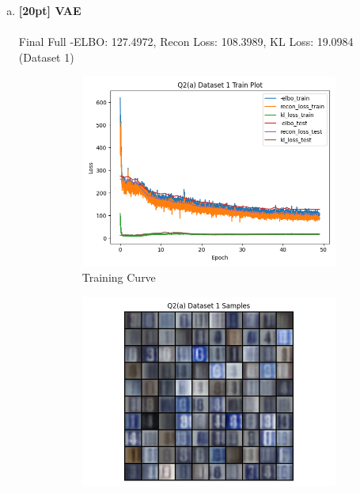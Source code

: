 \documentclass{article}
\begin{document}
\newpage
{}

\begin{enumerate}[(a)]
  \item {\bf [20pt] VAE} \\\\
  Final Full -ELBO: 127.4972, Recon Loss: 108.3989, KL Loss: 19.0984 (Dataset 1)
  \begin{figure}[H]
         \centering
         \begin{subfigure}[b]{0.475\textwidth}
             \centering
             \includegraphics[width=\textwidth]{figures/q2_a_dset1_train_plot.png}
             \caption{Training Curve}
         \end{subfigure}
         \hfill
         \begin{subfigure}[b]{0.475\textwidth}
             \centering
             \includegraphics[width=\textwidth]{figures/q2_a_dset1_samples.png}

\end{subfigure}
\end{figure}
\end{enumerate}
\end{document}
